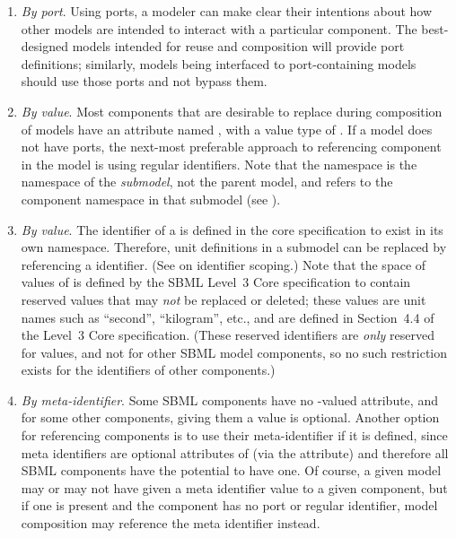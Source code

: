 \begin{enumerate}

\item \emph{By port}.  Using ports, a modeler can make clear their intentions about how other models are intended to interact with a particular component.  The best-designed models intended for reuse and composition will provide port definitions; similarly, models being interfaced to port-containing models should use those ports and not bypass them.

\item \emph{By \fixttspace{} value}.  Most components that are desirable to replace during composition of models have an attribute named , with a value type of .  If a model does not have ports, the next-most preferable approach to referencing component in the model is using regular identifiers.  Note that the  namespace is the namespace of the \emph{submodel}, not the parent model, and refers to the component namespace in that submodel (see ).

\item \emph{By \fixttspace{} value}.  The identifier of a \UnitDefinition is defined in the core specification to exist in its own namespace.  Therefore, unit definitions in a submodel can be replaced by referencing a \UnitDefinition identifier.  (See  on identifier scoping.)  Note that the space of values of  is defined by the SBML Level~3 Core specification to contain reserved values that may \emph{not} be replaced or deleted; these values are unit names such as ``second'', ``kilogram'', etc., and are defined in Section~4.4 of the Level~3 Core specification.  (These reserved identifiers are \emph{only} reserved for \UnitDefinition values, and not for other SBML model components, so no such restriction exists for the identifiers of other components.)

\item \emph{By meta-identifier}.  Some SBML components have no -valued attribute, and for some other components, giving them a value is optional.  Another option for referencing components is to use their meta-identifier if it is defined, since meta identifiers are optional attributes of \SBase (via the  attribute) and therefore all SBML components have the potential to have one.  Of course, a given model may or may not have given a meta identifier value to a given component, but if one is present and the component has no port or regular identifier, model composition may reference the meta identifier instead.


\end{enumerate}
